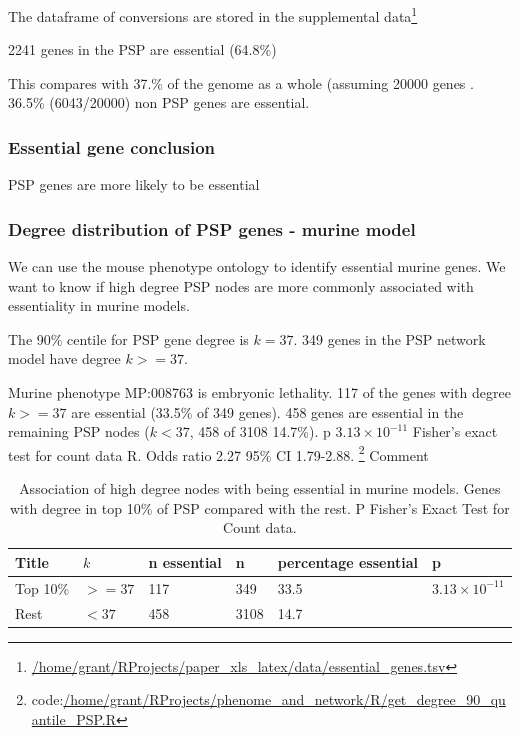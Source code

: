  The dataframe of conversions are stored in the supplemental data\footnote{ \url{/home/grant/RProjects/paper_xls_latex/data/essential_genes.tsv}}

2241 genes in the PSP are essential (64.8\%)

This compares with 37.\% of the genome as a whole (assuming 20000 genes . 36.5\% (6043/20000) non PSP genes are essential. 

\subsubsection{Essential gene conclusion}
PSP genes are more likely to be essential


 \subsubsection{Degree distribution of PSP genes - murine model}
 
 We can use the mouse phenotype ontology to identify essential murine genes. 
 We want to know if high degree PSP nodes are more commonly associated with essentiality in murine models. 
 
 The 90\% centile for PSP gene degree is $k=37$. 349 genes in the PSP network model have degree $k>=37$.
 
 Murine phenotype MP:008763 is embryonic lethality. 117 of the genes with degree $k>=37$ are essential (33.5\% of 349 genes). 458 genes are essential in the remaining PSP nodes ($k < 37$, 458 of 3108 14.7\%). p $3.13 \times 10^{-11}$ Fisher's exact test for count data R. Odds ratio 2.27 95\% CI 1.79-2.88. \footnote{code:\url{/home/grant/RProjects/phenome_and_network/R/get_degree_90_quantile_PSP.R}}  Comment 
 
 \begin{table}[h]
     \centering
     \begin{tabular}{llllll}
          Title & $k$& n essential & n & percentage essential & p   \\
          \hline
          Top 10\% & $>=37$ & 117 & 349 & 33.5 & $3.13 \times 10^{-11}$\\
          Rest & $<37$ & 458 & 3108 & 14.7 & \\
     \end{tabular}
     \caption{Association of high degree nodes with being essential in murine models. Genes with degree in top 10\% of PSP compared with the rest. P Fisher's Exact Test for Count data.}
     \label{Table:Degree and murine essentialness PSP}
 \end{table}
 

